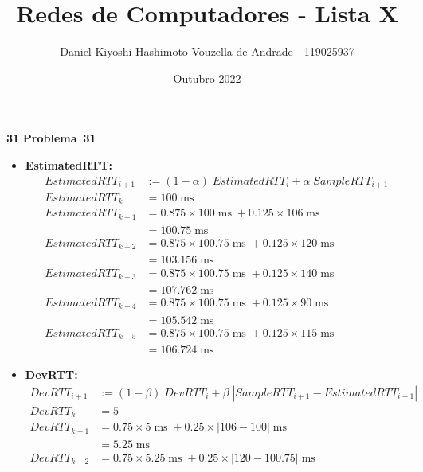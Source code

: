 \documentclass{article}
\title{Redes de Computadores - Lista X}
\author{Daniel Kiyoshi Hashimoto Vouzella de Andrade - 119025937}
\date{Outubro 2022}
\newcommand{\blank}{\rule[0pt]{5em}{.3pt}}
\newcommand{\preamble}[2]{\noindent%
    Fiz esse trabalho com a ajuda de {\bfseries #1}
    e consultei {\bfseries #2}.
    A versão final do trabalho foi feita
    por mim de forma independente.
    Respostas sem no mínimo 3 frases de justificativa
    não contam ponto.
    \par\noindent Assinatura: \blank\blank\bigskip}
\newcounter{exe-list}
\newenvironment{exe}[2][Problema]
    {\newcommand{\opt}{(Opcional)}%
    \newcommand{\sketch}[1]{{\bfseries Rascunho:} ##1}%
    \medskip\par\noindent\ifthenelse{\equal{#1}{}}
        {\textbf{\large #2}}
        {\textbf{\large #1~#2}}%
    \medskip\par\noindent}
    {\medskip}
\DeclareMathOperator{\ms}{ms}
\begin{document}
\maketitle


\begin{exe}{31}
    \begin{itemize}
        \item \textbf{EstimatedRTT:}
            \begin{align*}
                EstimatedRTT_{i+1} &:= (1 - \alpha) \; EstimatedRTT_i
                    + \alpha \; SampleRTT_{i+1} \\
                EstimatedRTT_k &= 100 \ms \\
                EstimatedRTT_{k+1} &= 0.875 \times 100 \ms
                    + 0.125 \times 106 \ms \\
                &= 100.75 \ms \\
                EstimatedRTT_{k+2} &= 0.875 \times 100.75 \ms
                    + 0.125 \times 120 \ms \\
                &= 103.156 \ms \\
                EstimatedRTT_{k+3} &= 0.875 \times 100.75 \ms
                    + 0.125 \times 140 \ms \\
                &= 107.762 \ms \\
                EstimatedRTT_{k+4} &= 0.875 \times 100.75 \ms
                    + 0.125 \times 90 \ms \\
                &= 105.542 \ms \\
                EstimatedRTT_{k+5} &= 0.875 \times 100.75 \ms
                    + 0.125 \times 115 \ms \\
                &= 106.724 \ms
            \end{align*}
        \item \textbf{DevRTT:}
            \begin{align*}
                DevRTT_{i+1} &:= (1 - \beta) \; DevRTT_i
                    + \beta \; |SampleRTT_{i+1} - EstimatedRTT_{i+1}| \\
                DevRTT_k &= 5 \\
                DevRTT_{k+1} &= 0.75 \times 5 \ms
                    + 0.25 \times |106 - 100| \ms \\
                &= 5.25 \ms \\
                DevRTT_{k+2} &= 0.75 \times 5.25 \ms
                    + 0.25 \times |120 - 100.75| \ms \\

\end{align*}
\end{itemize}
\end{exe}
\end{document}
